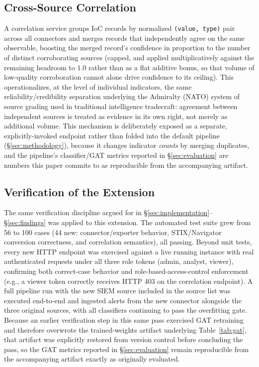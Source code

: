 \documentclass[conference]{IEEEtran}
\begin{document}
\subsection{Cross-Source Correlation}
A correlation service groups IoC records by normalized \texttt{(value, type)} pair across all connectors and merges records that independently agree on the same observable, boosting the merged record's confidence in proportion to the number of distinct corroborating sources (capped, and applied multiplicatively against the remaining headroom to $1.0$ rather than as a flat additive bonus, so that volume of low-quality corroboration cannot alone drive confidence to its ceiling). This operationalizes, at the level of individual indicators, the same reliability/credibility separation underlying the Admiralty (NATO) system of source grading used in traditional intelligence tradecraft: agreement between independent sources is treated as evidence in its own right, not merely as additional volume. This mechanism is deliberately exposed as a separate, explicitly-invoked endpoint rather than folded into the default pipeline (\S\ref{sec:methodology}), because it changes indicator \emph{counts} by merging duplicates, and the pipeline's classifier/GAT metrics reported in \S\ref{sec:evaluation} are numbers this paper commits to as reproducible from the accompanying artifact.

\subsection{Verification of the Extension}
\label{sec:extension-verification}
The same verification discipline argued for in \S\ref{sec:implementation}--\S\ref{sec:findings} was applied to this extension. The automated test suite grew from 56 to 100 cases (44 new: connector/exporter behavior, STIX/Navigator conversion correctness, and correlation semantics), all passing. Beyond unit tests, every new HTTP endpoint was exercised against a live running instance with real authenticated requests under all three role tokens (admin, analyst, viewer), confirming both correct-case behavior and role-based-access-control enforcement (e.g., a viewer token correctly receives HTTP 403 on the correlation endpoint). A full pipeline run with the new SIEM source included in the source list was executed end-to-end and ingested alerts from the new connector alongside the three original sources, with all classifiers continuing to pass the overfitting gate. Because an earlier verification step in this same pass exercised GAT retraining and therefore overwrote the trained-weights artifact underlying Table~\ref{tab:gat}, that artifact was explicitly restored from version control before concluding the pass, so the GAT metrics reported in \S\ref{sec:evaluation} remain reproducible from the accompanying artifact exactly as originally evaluated.
\end{document}
